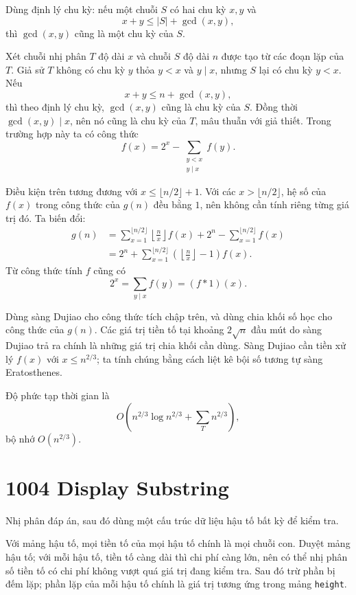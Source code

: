 \documentclass[11pt]{article}
\begin{document}
Dùng định lý chu kỳ: nếu một chuỗi $S$ có hai chu kỳ $x,y$ và
\[
  x+y\le |S|+\gcd(x,y),
\]
thì $\gcd(x,y)$ cũng là một chu kỳ của $S$.

Xét chuỗi nhị phân $T$ độ dài $x$ và chuỗi $S$ độ dài $n$ được tạo từ các
đoạn lặp của $T$. Giả sử $T$ không có chu kỳ $y$ thỏa $y<x$ và $y\mid x$,
nhưng $S$ lại có chu kỳ $y<x$. Nếu
\[
  x+y\le n+\gcd(x,y),
\]
thì theo định lý chu kỳ, $\gcd(x,y)$ cũng là chu kỳ của $S$. Đồng thời
$\gcd(x,y)\mid x$, nên nó cũng là chu kỳ của $T$, mâu thuẫn với giả thiết.
Trong trường hợp này ta có công thức
\[
  f(x)=2^x-\sum_{\substack{y<x\\y\mid x}} f(y).
\]

Điều kiện trên tương đương với $x\le \lfloor n/2\rfloor+1$. Với các
$x>\lfloor n/2\rfloor$, hệ số của $f(x)$ trong công thức của $g(n)$ đều bằng
$1$, nên không cần tính riêng từng giá trị đó. Ta biến đổi:
\[
  \begin{aligned}
  g(n)
    &= \sum_{x=1}^{\lfloor n/2\rfloor}
       \left\lfloor\frac{n}{x}\right\rfloor f(x)
       +2^n-\sum_{x=1}^{\lfloor n/2\rfloor} f(x)\\
    &= 2^n+\sum_{x=1}^{\lfloor n/2\rfloor}
       \left(\left\lfloor\frac{n}{x}\right\rfloor-1\right)f(x).
  \end{aligned}
\]
Từ công thức tính $f$ cũng có
\[
  2^x=\sum_{y\mid x} f(y) = (f*1)(x).
\]

Dùng sàng Dujiao cho công thức tích chập trên, và dùng chia khối số học cho
công thức của $g(n)$. Các giá trị tiền tố tại khoảng $2\sqrt n$ đầu mút do
sàng Dujiao trả ra chính là những giá trị chia khối cần dùng. Sàng Dujiao cần
tiền xử lý $f(x)$ với $x\le n^{2/3}$; ta tính chúng bằng cách liệt kê bội số
tương tự sàng Eratosthenes.

Độ phức tạp thời gian là
\[
  O\left(n^{2/3}\log n^{2/3}+\sum_T n^{2/3}\right),
\]
bộ nhớ $O(n^{2/3})$.

\section{1004 Display Substring}

Nhị phân đáp án, sau đó dùng một cấu trúc dữ liệu hậu tố bất kỳ để kiểm tra.

Với mảng hậu tố, mọi tiền tố của mọi hậu tố chính là mọi chuỗi con. Duyệt
mảng hậu tố; với mỗi hậu tố, tiền tố càng dài thì chi phí càng lớn, nên có
thể nhị phân số tiền tố có chi phí không vượt quá giá trị đang kiểm tra. Sau
đó trừ phần bị đếm lặp; phần lặp của mỗi hậu tố chính là giá trị tương ứng
trong mảng \texttt{height}.
\end{document}

